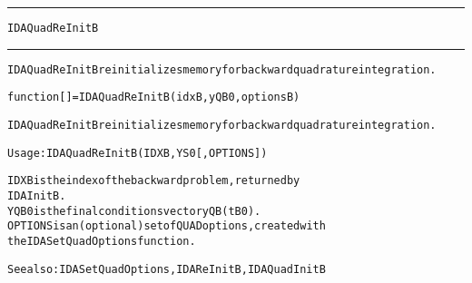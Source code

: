 \begin{samepage}
\hrule
\begin{center}
{\large \verb!IDAQuadReInitB!}
\label{p:IDAQuadReInitB}
\end{center}
\hrule\vspace{0.1in}



\begin{alltt}
IDAQuadReInitB reinitializes memory for backward quadrature integration.
\end{alltt}

\end{samepage}



\begin{samepage}


\begin{alltt}
function [] = IDAQuadReInitB(idxB, yQB0, optionsB) 
\end{alltt}

\end{samepage}



\begin{alltt}
IDAQuadReInitB reinitializes memory for backward quadrature integration.

   Usage: IDAQuadReInitB ( IDXB, YS0 [, OPTIONS ] ) 

   IDXB     is the index of the backward problem, returned by
            IDAInitB.
   YQB0     is the final conditions vector yQB(tB0).
   OPTIONS  is an (optional) set of QUAD options, created with
            the IDASetQuadOptions function. 

   See also: IDASetQuadOptions, IDAReInitB, IDAQuadInitB
\end{alltt}






\vspace{0.1in}